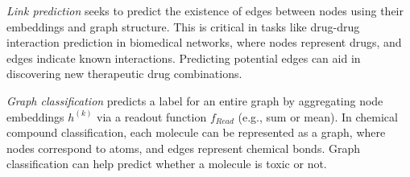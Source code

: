 \textit{Link prediction} seeks to predict the existence of edges between nodes using their embeddings and graph structure. This is critical in tasks like drug-drug interaction prediction in biomedical networks, where nodes represent drugs, and edges indicate known interactions. Predicting potential edges can aid in discovering new therapeutic drug combinations. 

\textit{Graph classification} predicts a label for an entire graph by aggregating node embeddings $h^{(k)}$ via a readout function $f_{Read}$ (e.g., sum or mean). In chemical compound classification, each molecule can be represented as a graph, where nodes correspond to atoms, and edges represent chemical bonds. Graph classification can help predict whether a molecule is toxic or not.


